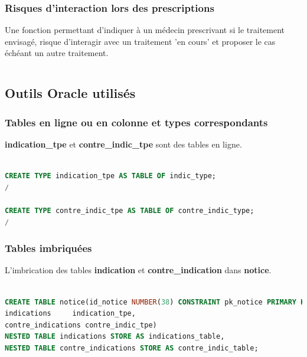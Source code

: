 \documentclass[12pt,a4paper]{article}
\begin{document}
\subsubsection{Risques d'interaction lors des prescriptions}
Une fonction permettant d’indiquer à un médecin prescrivant si le traitement envisagé, risque d’interagir avec un traitement ’en cours’ et proposer le cas	échéant un autre traitement.
\begin{lstlisting}[frame=single, language=SQL]

\end{lstlisting}




\subsection{Outils Oracle utilisés}

\subsubsection{Tables en ligne ou en colonne et types correspondants}

\textbf{indication\_tpe} et \textbf{contre\_indic\_tpe}  sont des tables en ligne.


\begin{lstlisting}[frame=single, language=SQL]

CREATE TYPE indication_tpe AS TABLE OF indic_type;
/

CREATE TYPE contre_indic_tpe AS TABLE OF contre_indic_type;
/

\end{lstlisting}


\subsubsection{Tables imbriquées}

L'imbrication des tables \textbf{indication} et \textbf{contre\_indication} dans \textbf{notice}.

\begin{lstlisting}[frame=single, language=SQL]

CREATE TABLE notice(id_notice NUMBER(38) CONSTRAINT pk_notice PRIMARY KEY, 
indications     indication_tpe,
contre_indications contre_indic_tpe)
NESTED TABLE indications STORE AS indications_table,
NESTED TABLE contre_indications STORE AS contre_indic_table;

\end{lstlisting}
\end{document}
